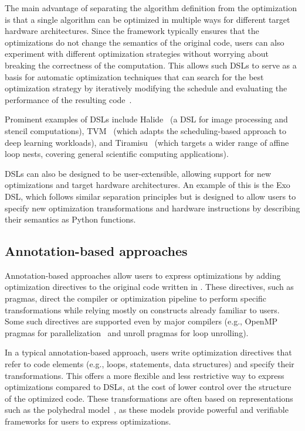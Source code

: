 The main advantage of separating the algorithm definition from the optimization is that a single algorithm can be optimized in multiple ways for different target hardware architectures. Since the framework typically ensures that the optimizations do not change the semantics of the original code, users can also experiment with different optimization strategies without worrying about breaking the correctness of the computation. This allows such DSLs to serve as a basis for automatic optimization techniques that can search for the best optimization strategy by iteratively modifying the schedule and evaluating the performance of the resulting code~\cite{ragan2013halide,chen2018tvm,merouani2025agentic}.

Prominent examples of DSLs include Halide~\cite{ragan2013halide} (a DSL for image processing and stencil computations), TVM~\cite{chen2018tvm} (which adapts the scheduling-based approach to deep learning workloads), and Tiramisu~\cite{baghdadi2019tiramisu} (which targets a wider range of affine loop nests, covering general scientific computing applications).

DSLs can also be designed to be user-extensible, allowing support for new optimizations and target hardware architectures. An example of this is the Exo~\cite{ikarashi2022exocompilation} DSL, which follows similar separation principles but is designed to allow users to specify new optimization transformations and hardware instructions by describing their semantics as Python functions.


\subsection{Annotation-based approaches}\label{sec:annotation}

Annotation-based approaches allow users to express optimizations by adding optimization directives to the original code written in \cpp. These directives, such as pragmas, direct the compiler or optimization pipeline to perform specific transformations while relying mostly on constructs already familiar to \cpp users. Some such directives are supported even by major compilers (e.g., OpenMP pragmas for parallelization~\cite{openmp_6.0_spec} and unroll pragmas for loop unrolling).

In a typical annotation-based approach, users write optimization directives that refer to code elements (e.g., loops, statements, data structures) and specify their transformations. This offers a more flexible and less restrictive way to express optimizations compared to DSLs, at the cost of lower control over the structure of the optimized code. These transformations are often based on representations such as the polyhedral model~\cite{namjoshi2016loopy,chen2008chill,hartono2009annotation}, as these models provide powerful and verifiable frameworks for users to express optimizations.

